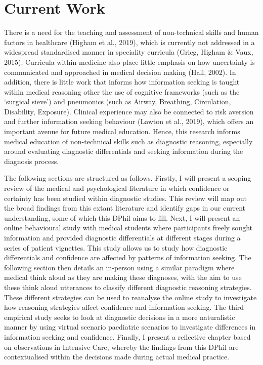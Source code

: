 \documentclass[a4paper, nobind]{templates/ociamthesis}
\begin{document}
\section*{Current Work}\label{current-work}

There is a need for the teaching and assessment of non-technical skills and human factors in healthcare (Higham et al., 2019), which is currently not addressed in a widespread standardised manner in speciality curricula (Grieg, Higham \& Vaux, 2015). Curricula within medicine also place little emphasis on how uncertainty is communicated and approached in medical decision making (Hall, 2002). In addition, there is little work that informs how information seeking is taught within medical reasoning other the use of cognitive frameworks (such as the `surgical sieve') and pneumonics (such as Airway, Breathing, Circulation, Disability, Exposure). Clinical experience may also be connected to risk aversion and further information seeking behaviour (Lawton et al., 2019), which offers an important avenue for future medical education. Hence, this research informs medical education of non-technical skills such as diagnostic reasoning, especially around evaluating diagnostic differentials and seeking information during the diagnosis process.

The following sections are structured as follows. Firstly, I will present a scoping review of the medical and psychological literature in which confidence or certainty has been studied within diagnostic studies. This review will map out the broad findings from this extant literature and identify gaps in our current understanding, some of which this DPhil aims to fill. Next, I will present an online behavioural study with medical students where participants freely sought information and provided diagnostic differentials at different stages during a series of patient vignettes. This study allows us to study how diagnostic differentials and confidence are affected by patterns of information seeking. The following section then details an in-person using a similar paradigm where medical think aloud as they are making these diagnoses, with the aim to use these think aloud utterances to classify different diagnostic reasoning strategies. These different strategies can be used to reanalyse the online study to investigate how reasoning strategies affect confidence and information seeking. The third empirical study seeks to look at diagnostic decisions in a more naturalistic manner by using virtual scenario paediatric scenarios to investigate differences in information seeking and confidence. Finally, I present a reflective chapter based on observations in Intensive Care, whereby the findings from this DPhil are contextualised within the decisions made during actual medical practice.
\end{document}

